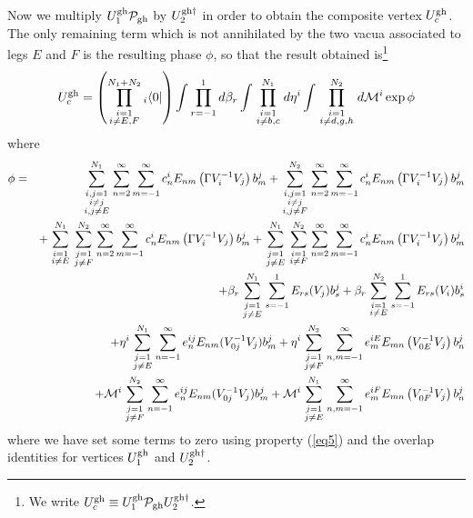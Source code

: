 \documentclass[a4paper,11pt]{article}
\begin{document}
Now we multiply $U^{\rm gh}_1{\cal P}_{\rm gh}$ by $U^{{\rm gh}\dagger }_2$ in order to obtain the composite vertex $U_c^{\rm gh}$. The only remaining term which is not annihilated by the two vacua associated to legs $E$ and $F$ is the resulting phase $\phi $, so that the result obtained is\footnote{We write $U^{\rm gh}_c\equiv U^{\rm gh}_1{\cal P}_{\rm gh}U_2^{{\rm gh}\dagger }$.}
\begin{equation}
U_c^{\rm gh}=\left( \prod_{\scriptstyle i=1\atop \scriptstyle i\neq E,F}^{N_1+N_2}{ }_i\langle 0|\right) \int \prod_{r=-1}^1d\beta _r\int \prod_{\scriptstyle i=1\atop \scriptstyle i\neq b,c}^{N_1}d\eta ^i\int \prod_{\scriptstyle i=1\atop \scriptstyle i\neq d,g,h}^{N_2}d{\cal M}^i\exp \phi 
\end{equation}
where
\begin{eqnarray}
\phi  & = & \sum_{{\scriptstyle i,j=1\atop \scriptstyle i \neq j}\atop \scriptstyle i,j\neq E}^{N_1} \sum_{n=2}^\infty \sum_{m=-1}^\infty c_n^i E_{nm}\left( \Gamma V^{-1}_iV_j \right) b_m^j +\sum_{{\scriptstyle i,j=1\atop \scriptstyle i\neq j}\atop \scriptstyle i,j\neq F}^{N_2} \sum_{n=2}^\infty \sum_{m=-1}^\infty c_n^i E_{nm}\left( \Gamma V^{-1}_i V_j \right) b_m^j\nonumber \\
 & & +\sum_{\scriptstyle i=1\atop \scriptstyle i\neq E}^{N_1} \sum_{\scriptstyle j=1\atop \scriptstyle j \neq F}^{N_2} \sum_{n=2}^\infty \sum_{m=-1}^\infty c_n^i E_{nm}\left( \Gamma V^{-1}_i V_j\right) b_m^j +\sum_{\scriptstyle j=1\atop \scriptstyle j \neq E}^{N_1} \sum_{\scriptstyle i=1\atop \scriptstyle i\neq F}^{N_2} \sum_{n=2}^\infty \sum_{m=-1}^\infty c_n^i E_{nm}\left( \Gamma V^{-1}_i V_j\right) b_m^j\nonumber \\ 
 & & +\beta _r \sum_{\scriptstyle j=1\atop \scriptstyle j\neq E}^{N_1} \sum_{s=-1}^1 E_{rs}(V_j) b_s^j +\beta _r \sum_{\scriptstyle i=1\atop \scriptstyle i \neq E}^{N_2} \sum_{s=-1}^1 E_{rs}(V_i) b_s^i\nonumber \\ 
 & & +\eta ^i \sum_{\scriptstyle j=1\atop \scriptstyle j\neq E}^{N_1} \sum_{n=-1}^\infty e_n^{ij} E_{nm} (V_{0j}^{-1} V_j) b_m^j +\eta ^i \sum_{\scriptstyle j=1\atop \scriptstyle j \neq F}^{N_2} \sum_{n,m=-1}^\infty e_m^{iE} E_{mn} \left( V_{0E}^{-1} V_j\right) b_n^j\nonumber \\ 
 & & +{\cal M}^i \sum_{\scriptstyle j=1 \atop \scriptstyle j \neq F}^{N_2} \sum_{n=-1}^\infty e_n^{ij} E_{nm}(V_{0j}^{-1} V_j) b_m^j +{\cal M}^i \sum_{\scriptstyle j=1\atop \scriptstyle j \neq E}^{N_1} \sum_{n,m=-1}^\infty e_m^{iF} E_{mn} \left( V_{0F}^{-1} V_j\right) b_n^j
\end{eqnarray}
where we have set some terms to zero using property (\ref{eq5}) and the overlap identities for vertices $U_1^{\rm gh}$ and $U_2^{{\rm gh}\dagger }$.
\end{document}
